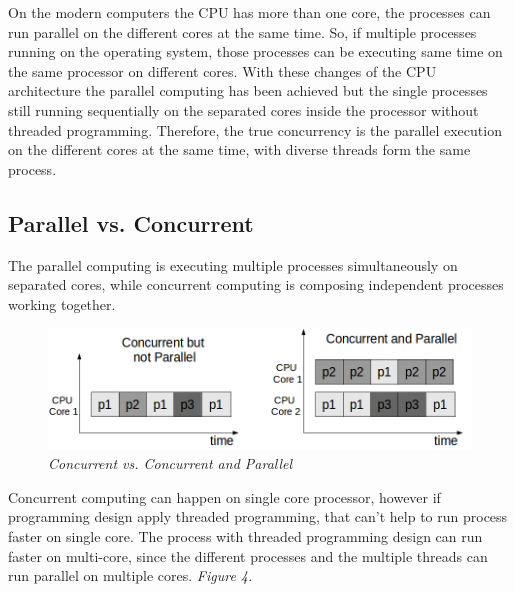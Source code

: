 \documentclass[12pt]{article}
\begin{document}
On the modern computers the CPU has more than one core, the processes can run parallel on the different cores at the same time. So, if multiple processes running on the operating system, those processes can be executing same time on the same processor on different cores. With these changes of the CPU architecture the parallel computing has been achieved but the single processes still running sequentially on the separated cores inside the processor without threaded programming. Therefore, the true concurrency is the parallel execution on the different cores at the same time, with diverse threads form the same process.

\subsection{Parallel vs. Concurrent}
The parallel computing is executing multiple processes simultaneously on separated cores, while concurrent computing is composing independent processes working together. 

\begin{figure}[h!]
\centering
\includegraphics[scale=0.3]{Pictures/concurrent_vs_parallel.png}
\caption{\textit{\color{gray}Concurrent vs. Concurrent and Parallel \cite{Nikolay}}}
\end{figure}

Concurrent computing can happen on single core processor, however if programming design apply threaded programming, that can’t help to run process faster on single core. The process with threaded programming design can run faster on multi-core, since the different processes and the multiple threads can run parallel on multiple cores. \textit{\color{gray}Figure 4.}\\
\end{document}
